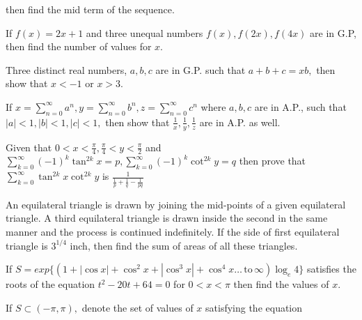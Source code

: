   then find the mid term of the sequence.
\item If $f(x) = 2x + 1$ and three unequal numbers $f(x), f(2x), f(4x)$ are in G.P, then find the number of values for
  $x$.
\item Three distinct real numbers, $a, b, c$ are in G.P. such that $a + b + c = xb,$ then show that $x < -1$ or $x > 3$.
\item If $\displaystyle x = \sum_{n=0}^\infty a^n, y = \sum_{n=0}^\infty b^n, z = \sum_{n=0}^\infty c^n$ where $a, b, c$ are in A.P.,
  such that $|a| < 1, |b|< 1, |c| < 1,$ then show that $\frac{1}{x}, \frac{1}{y}, \frac{1}{z}$ are in A.P. as well.
\item Given that $0 < x< \frac{\pi}{4}, \frac{\pi}{4} < y <\frac{\pi}{2}$ and $\displaystyle\sum_{k=0}^\infty(-1)^k\tan^{2k}x = p,
  \sum_{k=0}^\infty(-1)^k\cot^{2k}y = q$ then prove that $\displaystyle\sum_{k = 0}^\infty \tan^{2k}x\cot^{2k}y$ is $\frac{1}{\frac{1}{p} +
    \frac{1}{q} - \frac{1}{pq}}$
\item An equilateral triangle is drawn by joining the mid-points of a given equilateral triangle. A third equilateral
  triangle is drawn inside the second in the same manner and the process is continued indefinitely. If the side of first
  equilateral triangle is $3^{1/4}$ inch, then find the sum of areas of all these triangles.
\item If $S = exp\{(1 + |\cos x| + \cos^2x + |\cos^3x| + \cos^4x \ldots\,\text{to}\,\infty)\log_e 4\}$ satisfies the roots of
  the equation $t^2 - 20t + 64 = 0$ for $0 < x< \pi$ then find the values of $x$.
\item If $S\subset (-\pi, \pi),$ denote the set of values of $x$ satisfying the equation

